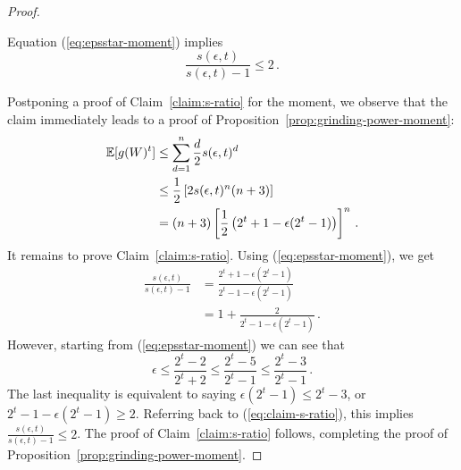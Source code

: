 \begin{proof}
\begin{claim}\label{claim:s-ratio}
Equation (\ref{eq:epsstar-moment}) implies
\[
\frac{s(\epsilon, t)}{s(\epsilon, t) - 1 } \leq 2\, .
\]
\end{claim}
Postponing a proof of Claim~\ref{claim:s-ratio} for the moment, we observe that the claim immediately leads to a proof of Proposition~\ref{prop:grinding-power-moment}:
\begin{align*}
\operatorname{\mathbb{E}}[ g(W)^t ] 
&\leq \sum_{d=1}^n{\frac{d}{2} s(\epsilon, t)^d}\\
&\leq \frac{1}{2} \left[2 s(\epsilon,t)^n ( n + 3) \right] \\
&= (n+3)\left[\frac{1}{2}\left( 2^t + 1 - \epsilon (2^t -1) \right)\right]^n\, .
\end{align*}
It remains to prove Claim~\ref{claim:s-ratio}. Using (\ref{eq:epsstar-moment}), we get
\begin{align}
\frac{s(\epsilon, t)}{s(\epsilon, t)-1}
&= \frac{2^t + 1 - \epsilon(2^t - 1)}{2^t - 1 - \epsilon(2^t - 1)} \nonumber \\
&= 1 + \frac{2}{2^t - 1 - \epsilon(2^t - 1)} \label{eq:claim-s-ratio}
\, .
\end{align}
However, starting from (\ref{eq:epsstar-moment}) we can see that
\[
\epsilon 
\leq 
\frac{2^t - 2}{2^t +2} 
\leq 
\frac{2^t - 5}{2^t - 1}
\leq
\frac{2^t - 3}{2^t - 1}\, .
\]
The last inequality is equivalent to saying $\epsilon(2^t - 1) \leq 2^t - 3$, or $2^t - 1 -\epsilon(2^t - 1) \geq 2$. Referring back to (\ref{eq:claim-s-ratio}), this implies $\displaystyle \frac{s(\epsilon, t)}{s(\epsilon, t)-1} \leq 2$. The proof of Claim~\ref{claim:s-ratio} follows, completing the proof of Proposition~\ref{prop:grinding-power-moment}.
\end{proof}